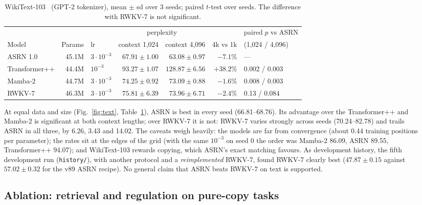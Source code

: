 \documentclass[11pt]{article}
\begin{document}
\begin{table}[t]
\centering\small
\begin{tabular}{lrlrrrl}
\toprule
& & & \multicolumn{2}{c}{perplexity} & & paired $p$ vs ASRN\\
\cmidrule(lr){4-5}
Model & Params & lr & context 1{,}024 & context 4{,}096 & 4k vs 1k & (1{,}024 / 4{,}096)\\
\midrule
ASRN 1.0 & 45.1M & $3\cdot10^{-3}$ & $\mathbf{67.91\pm1.00}$ & $\mathbf{63.08\pm0.97}$ & $-7.1\%$ & ---\\
Transformer++ & 44.4M & $10^{-3}$ & $93.27\pm1.07$ & $128.87\pm6.56$ & $+38.2\%$ & 0.002 / 0.003\\
Mamba-2 & 44.7M & $3\cdot10^{-3}$ & $74.25\pm0.92$ & $73.09\pm0.88$ & $-1.6\%$ & 0.008 / 0.003\\
RWKV-7 & 46.3M & $3\cdot10^{-3}$ & $75.81\pm6.39$ & $73.96\pm6.71$ & $-2.4\%$ & 0.13 / 0.084\\
\bottomrule
\end{tabular}
\caption{WikiText-103~\cite{merity2016pointer} (GPT-2 tokenizer), mean $\pm$ sd over 3 seeds; paired $t$-test over
seeds. The difference with RWKV-7 is not significant.}
\label{tab:text}
\end{table}

At equal data and size (Fig.~\ref{fig:text}, Table~\ref{tab:text}), ASRN is best in every seed (66.81--68.76). Its
advantage over the Transformer++ and Mamba-2 is significant at both context lengths; over RWKV-7 it is not: RWKV-7
varies strongly across seeds (70.24--82.78) and trails ASRN in all three, by 6.26, 3.43 and 14.02. The caveats weigh
heavily: the models are far from convergence (about 0.44 training positions per parameter); the rates sit at the edges
of the grid (with the same $10^{-3}$ on seed 0 the order was Mamba-2 86.09, ASRN 89.55, Transformer++ 94.07); and
WikiText-103 rewards copying, which ASRN's exact matching favours. As development history, the fifth development run
(\nolinkurl{history/}), with another protocol and a \emph{reimplemented} RWKV-7, found RWKV-7 clearly best
($47.87\pm0.15$ against $57.02\pm0.32$ for the v89 ASRN recipe). No general claim that ASRN beats RWKV-7 on text is
supported.

\subsection{Ablation: retrieval and regulation on pure-copy tasks}
\label{sec:ablation}
\end{document}
